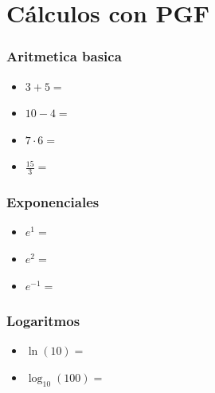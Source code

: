 \documentclass{beamer}
\begin{document}
\newcommand{\entero}[1]{\pgfmathprintnumber[fixed, precision=0]{#1}}
\newcommand{\decimal}[1]{\pgfmathprintnumber[fixed, precision=2]{#1}}
\newcommand{\porcentaje}[1]{%
  \pgfmathsetmacro{\temp}{#1*100}%
  \pgfmathprintnumber[fixed, precision=2]{\temp}\%%
  }

\section{Cálculos con PGF}


\begin{frame}
  \frametitle{Aritmetica basica}
  \begin{itemize}
    \item $3 + 5 =$ \entero{\suma}
    \item $10 - 4=$ \entero{\resta}
    \item $7 \cdot 6 =$ \entero{\multiplicacion}
    \item $\frac{15}{3} =$ \entero{\division}
    \end{itemize}

\end{frame}


\begin{frame}
  \frametitle{Exponenciales}
  \begin{itemize}
    \item $e^1 =$ \textbf{\expoUno}
    \item $e^2 =$ \textbf{\expoDos}
    \item $e^{-1} =$ \textbf{\expNegativo}
  \end{itemize}
\end{frame}


\begin{frame}
  \frametitle{Logaritmos}
  \begin{itemize}
    \item $\ln(10) =$ \textbf{\logNatural}
    \item $\log_{10}(100) =$ \textbf{\logBaseTen}
  \end{itemize}
\end{frame}
\end{document}
